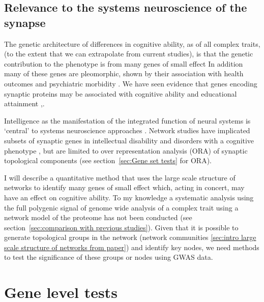 \subsection{Relevance to the systems neuroscience of the synapse}

The genetic architecture of differences in cognitive ability, as of all complex traits, (to the extent that we can extrapolate from current studies), is that the genetic contribution to the phenotype is from many genes of small effect\cite{plomin2015genetics} %
In addition many of these genes are pleomorphic, shown by their association with health outcomes \cite{deary2008intelligent} and psychiatric morbidity \cite{hill2016age}. We have seen evidence that genes encoding synaptic proteins may be associated with cognitive ability and educational attainment \cite{hill2014human},\cite{okbay2016genome}.

Intelligence as the manifestation of the integrated function of neural systems is ‘central’ to systems neuroscience approaches  \cite{plomin2015genetics}.
Network studies have implicated subsets of synaptic genes in intellectual disability and disorders with a cognitive phenotype \cite{pocklington2006proteomes},\cite{mclean2016improved} but are  limited to over representation analysis (ORA) of synaptic topological components (see section~\ref{sec:Gene set tests} for ORA). 

I will describe a quantitative method that uses the large scale structure of networks to identify many genes of small effect which, acting in concert, may have an effect on cognitive ability. To my knowledge a systematic analysis using the full polygenic signal of genome wide analysis of a complex trait using a network model of the proteome has not been conducted (see section~\ref{sec:comparison with previous studies}). Given that it is possible to generate topological groups in the network (network communities \ref{sec:intro large scale structure of networks from paper}) and identify key nodes, we need methods to test the significance of these groups or nodes using GWAS data. 





\section{Gene level tests}
\label{sec: gene level tests}



